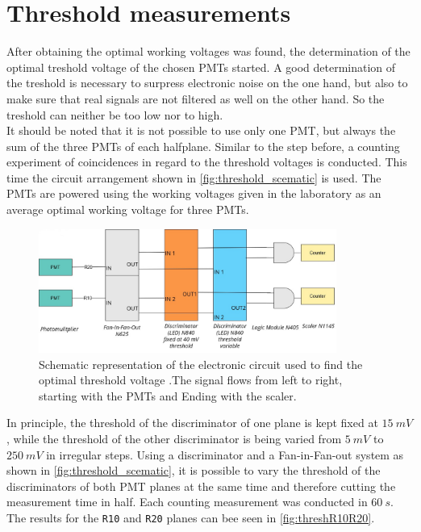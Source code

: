 \section{Threshold measurements}
After obtaining the optimal working voltages was found, the determination of the optimal 
treshold voltage of the chosen PMTs started. A good determination of the treshold is necessary 
to surpress electronic noise on the one hand, but also to make sure that real signals are not
 filtered as well on the other hand. So the treshold can neither be too low nor to high.\\
It should be noted that it is not possible to use only one PMT, but always the sum of the three PMTs
of each halfplane. 
 Similar to the step before, a counting experiment of coincidences in regard to the threshold voltages is conducted. This time the circuit arrangement shown in 
 \autoref{fig:threshold_scematic} is used. The PMTs are powered using the working voltages given 
 in the laboratory as an average optimal working voltage for three PMTs. \\
\begin{figure}
   \centering
   \includegraphics[width=0.87\textwidth]{figures/thresh.jpg}
   \caption{Schematic representation of the electronic circuit used to find the optimal threshold voltage
   .The signal flows from left to right, starting with the PMTs and Ending with the scaler.}
   \label{fig:threshold_scematic}
\end{figure}
In principle, the threshold of the discriminator of one plane is kept fixed at $\SI{15}{mV}$, while 
the threshold of the other discriminator is being varied from $\SI{5}{mV}$ to $\SI{250}{mV}$ in 
irregular steps. Using a discriminator and a Fan-in-Fan-out system as shown in \autoref{fig:threshold_scematic},
it is possible to vary the threshold of the discriminators of both PMT planes at the same time and therefore 
cutting the measurement time in half. Each counting measurement was conducted in $\SI{60}{s}$. \\ 
The results for the \texttt{R10} and \texttt{R20} planes can bee seen in \autoref{fig:threshR10R20}.
